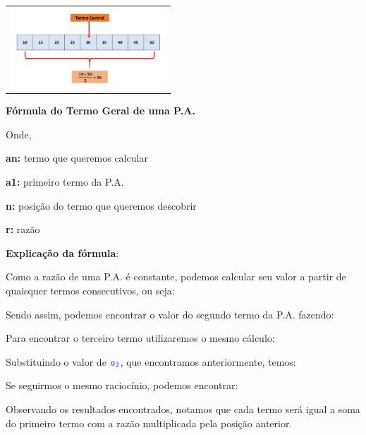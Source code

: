 \begin{multicols*}{2}
		\begin{tabular}{@{}c@{}}
		  \includegraphics[height=30mm]{assets/papropriedade3.jpg}
		\end{tabular}

\textbf{Fórmula do Termo Geral de uma P.A.}


Onde,

\textbf{an:} termo que queremos calcular

\textbf{a1:} primeiro termo da P.A.

\textbf{n:} posição do termo que queremos descobrir

\textbf{r:} razão

\textbf{Explicação da fórmula}:

Como a razão de uma P.A. é constante, podemos calcular seu valor a partir de quaisquer termos consecutivos, ou seja:



Sendo assim, podemos encontrar o valor do segundo termo da P.A. fazendo:


Para encontrar o terceiro termo utilizaremos o mesmo cálculo:


Substituindo o valor de $\color{blue}a_2$, que encontramos anteriormente, temos:


Se seguirmos o mesmo raciocínio, podemos encontrar:



Observando os resultados encontrados, notamos que cada termo será igual a soma do primeiro termo com a razão multiplicada pela posição anterior.


\end{multicols*}
